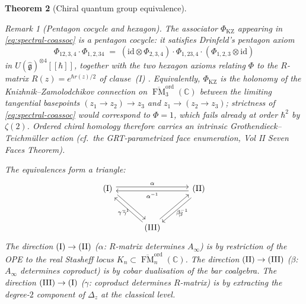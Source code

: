 \documentclass[11pt,reqno]{amsart}
\newtheorem{theorem}{Theorem}[section]
\theoremstyle{definition}
\theoremstyle{remark}
\newtheorem{remark}[theorem]{Remark}
\newcommand{\Ainf}{A_{\infty}}
\DeclareMathOperator{\FM}{FM}
\newcommand{\CC}{\mathbb{C}}
\newcommand{\id}{\mathrm{id}}
\numberwithin{equation}{section}
\begin{document}
\begin{theorem}[Chiral quantum group equivalence]
\begin{remark}[Pentagon cocycle and hexagon]
\label{rem:kz-associator-pentagon}
The associator $\Phi_{\mathrm{KZ}}$ appearing in
\eqref{eq:spectral-coassoc} is a \emph{pentagon cocycle}:
it satisfies Drinfeld's pentagon axiom
\[
  \Phi_{12,3,4} \cdot \Phi_{1,2,34}
  \;=\;
  (\id \otimes \Phi_{2,3,4}) \cdot \Phi_{1,23,4}
  \cdot (\Phi_{1,2,3} \otimes \id)
\]
in $U(\hat{\mathfrak g})^{\otimes 4}[[\hbar]]$, together with the
two hexagon axioms relating $\Phi$ to the $R$-matrix
$R(z) = e^{\hbar r(z)/2}$ of clause~(I)
\cite{Drinfeld91,Kontsevich99}. Equivalently,
$\Phi_{\mathrm{KZ}}$ is the holonomy of the Knizhnik--Zamolodchikov
connection on $\overline{\FM}_3^{\mathrm{ord}}(\CC)$ between the
limiting tangential basepoints $(z_1 \to z_2) \to z_3$ and
$z_1 \to (z_2 \to z_3)$; strictness of
\eqref{eq:spectral-coassoc} would correspond to $\Phi = 1$, which
fails already at order $\hbar^2$ by $\zeta(2)$. Ordered chiral
homology therefore carries an intrinsic Grothendieck--Teichm\"uller
action (cf.\ the GRT-parametrized face enumeration, Vol II Seven
Faces Theorem).
\end{remark}
The equivalences form a triangle:
\begin{equation}\label{eq:equiv-triangle-standalone}
\begin{tikzcd}[column sep=3em, row sep=3em]
  \textup{(I)} \ar[rr, shift left=1, "\alpha"]
  \ar[dr, shift left=1, "\gamma^{-1}"']
  && \textup{(II)} \ar[ll, shift left=1, "\alpha^{-1}"]
  \ar[dl, shift left=1, "\beta"] \\
  & \textup{(III)}
  \ar[ul, shift left=1, "\gamma"]
  \ar[ur, shift left=1, "\beta^{-1}"']
\end{tikzcd}
\end{equation}
The direction $\textup{(I)} \to \textup{(II)}$
($\alpha$: $R$-matrix determines $\Ainf$) is by restriction of
the OPE to the real Stasheff locus $K_n \subset
\overline{\FM}_n^{\mathrm{ord}}(\CC)$.
The direction $\textup{(II)} \to \textup{(III)}$
($\beta$: $\Ainf$ determines coproduct) is by cobar dualisation
of the bar coalgebra.
The direction $\textup{(III)} \to \textup{(I)}$
($\gamma$: coproduct determines $R$-matrix) is by extracting
the degree-$2$ component of $\Delta_z$ at the classical level.
\end{theorem}
\end{document}
